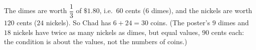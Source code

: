The dimes are worth $\dfrac{1}{3}$ of $\$1.80$, i.e.\ $60$ cents ($6$ dimes), and the nickels are worth $120$ cents ($24$ nickels). So Chad has $6+24=\boxed{30}$ coins. (The poster's $9$ dimes and $18$ nickels have twice as many nickels as dimes, but equal values, $90$ cents each: the condition is about the values, not the numbers of coins.)

